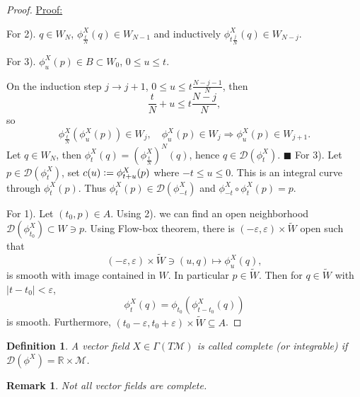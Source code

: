 \documentclass[8pt]{article}
\newtheorem{definition}{Definition}[section]
\newtheorem{remark}{Remark}[section]
\newenvironment{claimproof}[1]{\par\noindent\underline{Proof:}\space#1}{\hfill $\blacksquare$}
\newcommand{\defeq}{\vcentcolon=}
\newcommand{\R}[0]{\mathbb{R}}
\newcommand{\M}[0]{\mathcal{M}}
\begin{document}
\begin{proof}
\begin{claimproof}
    \par For 2). $q\in W_N$, $\phi^X_{{\frac t N}}(q)\in W_{N-1}$ and inductively $\phi^X_{t{\frac {j} N}}(q)\in W_{N-j}$.
    \par For 3). $\phi_u^X(p)\in B\subset W_0$, $0\leq u \leq t$. 
    \par On the induction step $j\to j+1$, $0\leq u\leq t{\frac {N-j-1} N}$, then 
    \begin{equation*}
      {\frac t N}+u\leq t{\frac {N-j} N},
    \end{equation*}
    so 
    \begin{equation*}
      \phi^X_{{\frac t N}}(\phi_u^X(p))\in W_j,\quad \phi_u^X(p)\in W_j\Rightarrow \phi_u^X(p)\in W_{j+1}.
    \end{equation*}
    Let $q\in W_N$, then $\phi_t^X(q) = (\phi^X_{{\frac t N}})^N(q)$, hence $q\in\mathcal{D}(\phi_t^X)$.
  \end{claimproof}
  For 3). Let $p\in\mathcal{D}(\phi_t^X)$, set $c(u)\defeq \phi_{t+u}^X(p)$ where $-t\leq u\leq 0$. This is an integral curve through $\phi_t^X(p)$. Thus $\phi_t^X(p)\in\mathcal{D}(\phi_{-t}^X)$ and $\phi_{-t}^X\circ\phi_{t}^X(p) = p$.\\
  \par For 1). Let $(t_0,p)\in A$. Using 2). we can find an open neighborhood $\mathcal{D}(\phi_{t_0}^X)\subset W\ni p$. Using Flow-box theorem, there is $(-\varepsilon,\varepsilon)\times \tilde{W}$ open such that 
  \begin{equation*}
    (-\varepsilon,\varepsilon)\times \tilde{W}\ni(u,q)\mapsto \phi_u^X(q),
  \end{equation*}
  is smooth with image contained in $W$. In particular $p\in \tilde{W}$. Then for $q\in\tilde{W}$ with $\vert t-t_0\vert<\varepsilon$, 
  \begin{equation*}
    \phi_t^X(q) = \phi_{t_0}(\phi_{t-t_0}^X(q))
  \end{equation*}
  is smooth. Furthermore, $(t_0-\varepsilon,t_0+\varepsilon)\times\tilde{W}\subseteq A$.
\end{proof}

\begin{definition}
A vector field $X\in\Gamma(T\M)$ is called complete  (or integrable) if $\mathcal{D}(\phi^X)=\R\times\M$.
\end{definition}

\begin{remark}
  Not all vector fields are complete. 
\end{remark}
\end{document}

